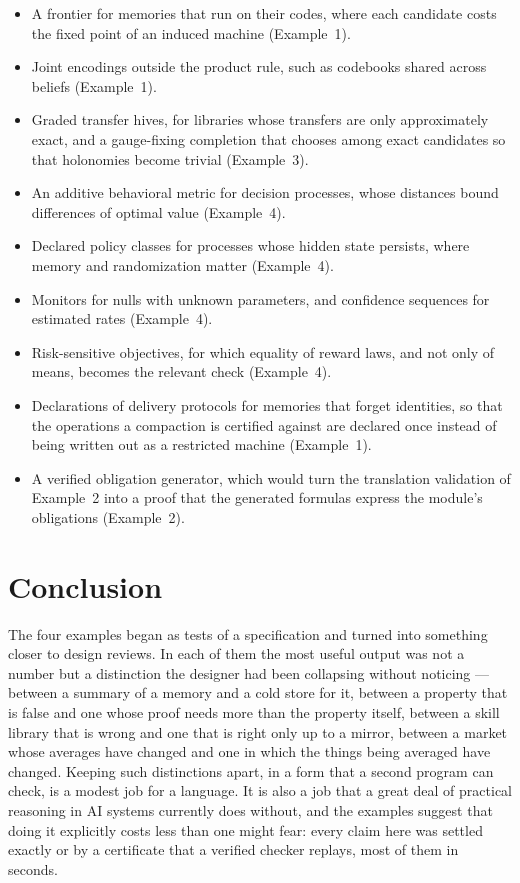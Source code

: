 \documentclass[11pt]{article}
\theoremstyle{definition}
\theoremstyle{plain}
\begin{document}
\begin{itemize}
\item A frontier for memories that run on their codes, where each candidate costs the fixed point of an
induced machine (Example~1).
\item Joint encodings outside the product rule, such as codebooks shared across beliefs (Example~1).
\item Graded transfer hives, for libraries whose transfers are only approximately exact, and a
gauge-fixing completion that chooses among exact candidates so that holonomies become trivial
(Example~3).
\item An additive behavioral metric for decision processes, whose distances bound differences of optimal
value (Example~4).
\item Declared policy classes for processes whose hidden state persists, where memory and randomization
matter (Example~4).
\item Monitors for nulls with unknown parameters, and confidence sequences for estimated rates
(Example~4).
\item Risk-sensitive objectives, for which equality of reward laws, and not only of means, becomes the
relevant check (Example~4).
\item Declarations of delivery protocols for memories that forget identities, so that the operations
a compaction is certified against are declared once instead of being written out as a restricted
machine (Example~1).
\item A verified obligation generator, which would turn the translation validation of Example~2 into
a proof that the generated formulas express the module's obligations (Example~2).
\end{itemize}

\section{Conclusion}\label{sec:conclusion}

The four examples began as tests of a specification and turned into something closer to design
reviews. In each of them the most useful output was not a number but a distinction the designer had been
collapsing without noticing --- between a summary of a memory and a cold store for it, between a
property that is false and one whose proof needs more than the property itself, between a skill
library that is wrong and one that is right only up to a mirror, between a market whose averages have
changed and one in which the things being averaged have changed. Keeping such distinctions apart, in a
form that a second program can check, is a modest job for a language. It is also a job that a great deal
of practical reasoning in AI systems currently does without, and the examples suggest that doing it
explicitly costs less than one might fear: every claim here was settled exactly or by a certificate that a
verified checker replays, most of them in seconds.
\end{document}
